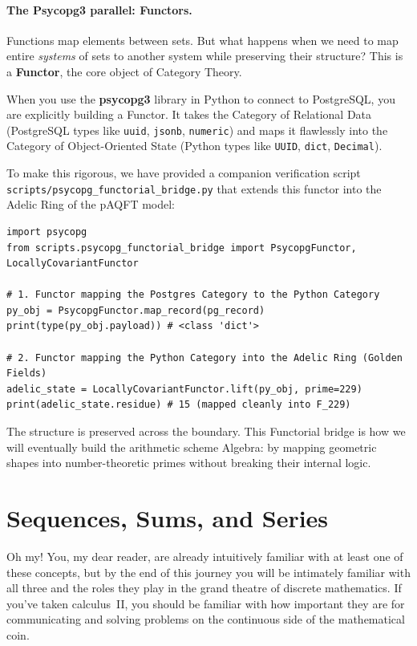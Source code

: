 \paragraph{The Psycopg3 parallel: Functors.}
Functions map elements between sets. But what happens when we need to map entire \emph{systems} of sets to another system while preserving their structure? This is a \textbf{Functor}, the core object of Category Theory.

When you use the \textbf{psycopg3} library in Python to connect to PostgreSQL, you are explicitly building a Functor. It takes the Category of Relational Data (PostgreSQL types like \texttt{uuid}, \texttt{jsonb}, \texttt{numeric}) and maps it flawlessly into the Category of Object-Oriented State (Python types like \texttt{UUID}, \texttt{dict}, \texttt{Decimal}). 

To make this rigorous, we have provided a companion verification script \texttt{scripts/psycopg\_functorial\_bridge.py} that extends this functor into the Adelic Ring of the pAQFT model:

\begin{verbatim}
import psycopg
from scripts.psycopg_functorial_bridge import PsycopgFunctor, LocallyCovariantFunctor

# 1. Functor mapping the Postgres Category to the Python Category
py_obj = PsycopgFunctor.map_record(pg_record)
print(type(py_obj.payload)) # <class 'dict'>

# 2. Functor mapping the Python Category into the Adelic Ring (Golden Fields)
adelic_state = LocallyCovariantFunctor.lift(py_obj, prime=229)
print(adelic_state.residue) # 15 (mapped cleanly into F_229)
\end{verbatim}

The structure is preserved across the boundary. This Functorial bridge is how we will eventually build the arithmetic scheme Algebra: by mapping geometric shapes into number-theoretic primes without breaking their internal logic.


\section{Sequences, Sums, and Series}

Oh my! You, my dear reader, are already intuitively familiar with at least one
of these concepts, but by the end of this journey you will be intimately
familiar with all three and the roles they play in the grand theatre of
discrete mathematics. If you've taken calculus~II, you should be familiar with
how important they are for communicating and solving problems on the continuous
side of the mathematical coin.

